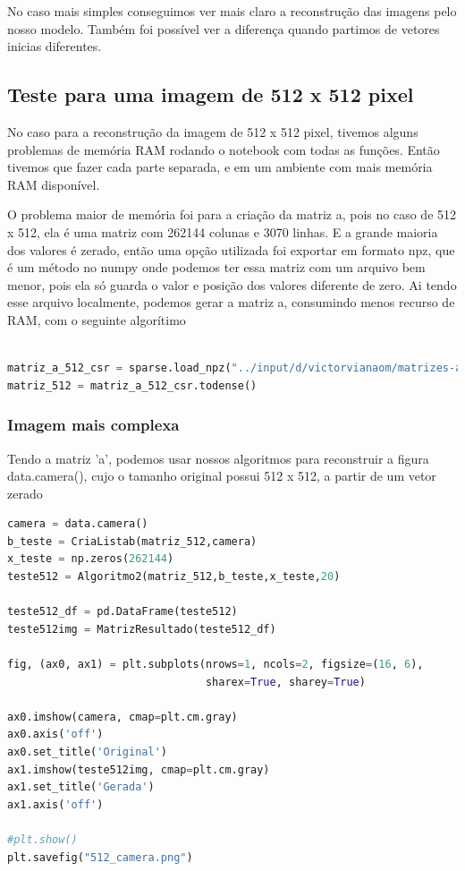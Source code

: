 \documentclass[a4paper, 12pt]{article}
\begin{document}
No caso mais simples conseguimos ver mais claro a reconstrução das imagens pelo nosso modelo. Também foi possível ver a diferença quando partimos de vetores inicias diferentes.

\subsection{Teste para uma imagem de 512 x 512 pixel}

No caso para a reconstrução da imagem de 512 x 512 pixel, tivemos alguns problemas de memória RAM rodando o notebook com todas as funções. Então tivemos que fazer cada parte separada, e em um ambiente com mais memória RAM disponível.

O problema maior de memória foi para a criação da matriz a, pois no caso de 512 x 512, ela é uma matriz com 262144 colunas e 3070 linhas. E a grande maioria dos valores é zerado, então uma opção utilizada foi exportar em formato npz, que é um método no numpy onde podemos ter essa matriz com um arquivo bem menor, pois ela só guarda o valor e posição dos valores diferente de zero.
Ai tendo esse arquivo localmente, podemos gerar a matriz a, consumindo menos recurso de RAM, com o seguinte algorítimo

\begin{lstlisting}[language=Python, caption = reconstruindo a matriz a do arquivo npz]

matriz_a_512_csr = sparse.load_npz("../input/d/victorvianaom/matrizes-a/matriz_a_512_csr.npz")
matriz_512 = matriz_a_512_csr.todense()

\end{lstlisting}

\subsubsection{Imagem mais complexa}

Tendo a matriz 'a', podemos usar nossos algoritmos para reconstruir a figura data.camera(), cujo o tamanho original possui 512 x 512, a partir de um vetor zerado

\begin{lstlisting}[language=Python, caption = imagem 512 x 512]
camera = data.camera()
b_teste = CriaListab(matriz_512,camera)
x_teste = np.zeros(262144)
teste512 = Algoritmo2(matriz_512,b_teste,x_teste,20)

teste512_df = pd.DataFrame(teste512)
teste512img = MatrizResultado(teste512_df)

fig, (ax0, ax1) = plt.subplots(nrows=1, ncols=2, figsize=(16, 6),
                               sharex=True, sharey=True)

ax0.imshow(camera, cmap=plt.cm.gray)
ax0.axis('off')
ax0.set_title('Original')
ax1.imshow(teste512img, cmap=plt.cm.gray)
ax1.set_title('Gerada')
ax1.axis('off')

#plt.show()
plt.savefig("512_camera.png")
\end{lstlisting}
\end{document}
